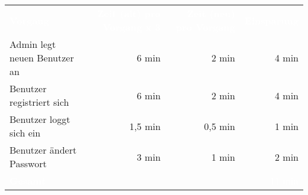 \begin{tabular}{lrrr}

\rowcolor{heading}
\textcolor{white}{\textbf{Vorgang}} &
\textcolor{white}{\textbf{Zeit (alt) pro Vorgang x 3}} &
\textcolor{white}{\textbf{Zeit (neu) pro Vorgang}} &
\textcolor{white}{\textbf{Einsparung}} \\





Admin legt neuen Benutzer an & 6 min     & 2 min & 4 min \\
\rowcolor{odd}Benutzer registriert sich & 6 min     & 2 min & 4 min\\
Benutzer loggt sich ein & 1,5 min  & 0,5 min & 1 min\\
\rowcolor{odd} Benutzer ändert Passwort & 3 min     & 1 min & 2 min \\
\hline
\hline
\rowcolor{heading}\textcolor{white}{\textbf{Gesamt}} &  &  & \textcolor{white}{11 min} \\
\end{tabular}
